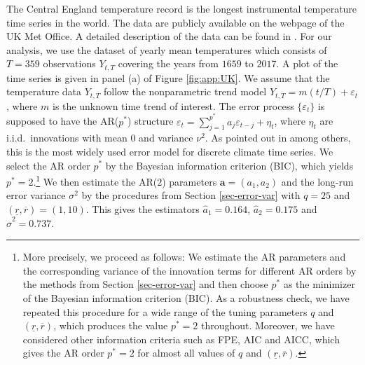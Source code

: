 The Central England temperature record is the longest instrumental temperature time series in the world. The data are publicly available on the webpage of the UK Met Office. A detailed description of the data can be found in \cite{Parker1992}. For our analysis, we use the dataset of yearly mean temperatures which consists of $T=359$ observations $Y_{t,T}$ covering the years from $1659$ to $2017$. A plot of the time series is given in panel (a) of Figure \ref{fig:app:UK}. We assume that the temperature data $Y_{t,T}$ follow the nonparametric trend model $Y_{t,T} = m(t/T) + \varepsilon_t$, where $m$ is the unknown time trend of interest. The error process $\{ \varepsilon_t \}$ is supposed to have the AR($p^*$) structure $\varepsilon_t = \sum_{j=1}^{p^*} a_j \varepsilon_{t-j} + \eta_t$, where $\eta_t$ are i.i.d.\ innovations with mean $0$ and variance $\nu^2$. As pointed out in \cite{Mudelsee2010} among others, this is the most widely used error model for discrete climate time series. We select the AR order $p^*$ by the Bayesian information criterion (BIC), which yields $p^*=2$.\footnote{More precisely, we proceed as follows: We estimate the AR parameters and the corresponding variance of the innovation terms for different AR orders by the methods from Section \ref{sec-error-var} and then choose $p^*$ as the minimizer of the Bayesian information criterion (BIC). As a robustness check, we have repeated this procedure for a wide range of the tuning parameters $q$ and $(\underline{r},\overline{r})$, which produces the value $p^*=2$ throughout. Moreover, we have considered other information criteria such as FPE, AIC and AICC, which gives the AR order $p^*=2$ for almost all values of $q$ and $(\underline{r},\overline{r})$.} We then estimate the AR($2$) parameters $\boldsymbol{a} = (a_1,a_2)$ and the long-run error variance $\sigma^2$ by the procedures from Section \ref{sec-error-var} with $q = 25$ and $(\underline{r},\overline{r}) = (1,10)$. This gives the estimators $\widehat{a}_1 = 0.164$, $\widehat{a}_2 = 0.175$ and $\widehat{\sigma}^2 = 0.737$.


